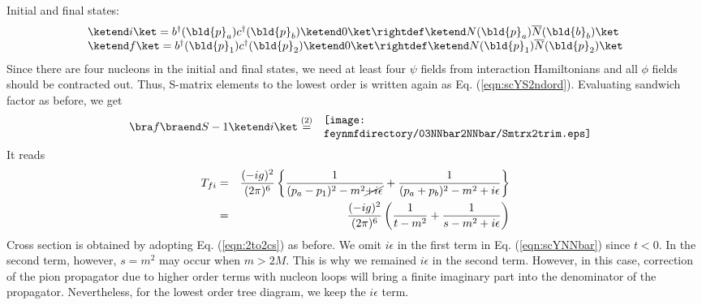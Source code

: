 Initial and final states:
\begin{eqnarray}
\begin{array}{l}
\ketend i \ket
=
b^\dagger(\bld{p}_a) c^\dagger(\bld{p}_b) \ketend 0 \ket
\rightdef
\ketend N(\bld{p}_a) \overline{N}(\bld{b}_b )\ket
\\
\ketend f \ket
=
b^\dagger(\bld{p}_1) c^\dagger(\bld{p}_2) \ketend 0 \ket
\rightdef
\ketend N(\bld{p}_1) \overline{N}(\bld{p}_2) \ket
\end{array}
\label{eqn:scYNNbarNNbarinit}
\end{eqnarray}
Since there are four nucleons in the initial and final states, we need at least 
four $\psi$ fields from interaction Hamiltonians and all $\phi$ fields should
be contracted out. Thus, S-matrix elements to the lowest order is written 
again as Eq. (\ref{eqn:scYS2ndord}). Evaluating sandwich factor as before,
we get
\begin{eqnarray}
\bra f \braend S - 1 \ketend i \ket
&\stackrel{(2)}{=}&
\parbox{80mm}{
\texttt{[image: \\feynmfdirectory/03NNbar2NNbar/Smtrx2trim.eps]}
}
\nonumber\\
\label{eqn:scYSmtrxFeynmDiag}
\end{eqnarray}
It reads
\begin{eqnarray}
T_{fi}
&=&
\frac{(-i g)^2}{(2\pi)^6} 
\left\{
\frac{1}{(p_a - p_1)^2 - m^2 \cancel{+ i\epsilon}}
+
\frac{1}{(p_a + p_b)^2 - m^2 + i\epsilon}
\right\}
\nonumber\\
&=&
\frac{(-i g)^2}{(2\pi)^6} 
\left(
\frac{1}{t - m^2}
+
\frac{1}{s - m^2 + i\epsilon}
\right)
\label{eqn:scYNNbar}
\end{eqnarray}
Cross section is obtained by adopting Eq. (\ref{eqn:2to2cs}) as before.
We omit $i \epsilon$ in the first term in Eq. (\ref{eqn:scYNNbar}) since
$t < 0$. In the second term, however, $s = m^2$ may occur when
$m > 2M$. This is why we remained $i \epsilon$ in the second term.
However, in this case, correction of the pion propagator due to higher
order terms with nucleon loops will bring a finite imaginary part into the
denominator of the propagator. Nevertheless, for the lowest order
tree diagram, we keep the $i \epsilon$ term.

\bigskip

